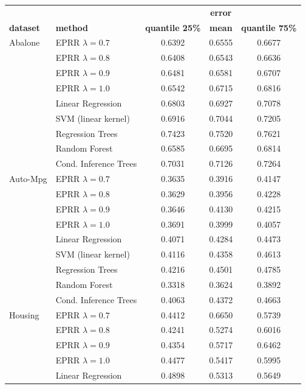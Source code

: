 \documentclass[review,preprint]{elsarticle}
\begin{document}
\begin{table}[t]
	\footnotesize
	\renewcommand{\arraystretch}{0.55}
	\begin{tabular}{ll|ccc}
		&&& \textbf{error} \\
		\textbf{dataset} & \textbf{method} & \textbf{quantile 25\%} & \textbf{mean} & \textbf{quantile 75\%} \\
		\hline
		Abalone	 & EPRR $\lambda = 0.7$ 	& 0.6392 & 0.6555 & 0.6677 \\
					 & EPRR $\lambda = 0.8$ 	& 0.6408 & 0.6543 & 0.6636 \\
					 & EPRR $\lambda = 0.9$ 	& 0.6481 & 0.6581 & 0.6707 \\
					 & EPRR $\lambda = 1.0$ 	& 0.6542 & 0.6715 & 0.6816 \\
					 & Linear Regression 	& 0.6803 & 0.6927 & 0.7078 \\
					 & SVM (linear kernel) 	& 0.6916 & 0.7044 & 0.7205 \\
					 & Regression Trees 	& 0.7423 & 0.7520 & 0.7621 \\
					 & Random Forest 	& 0.6585 & 0.6695 & 0.6814 \\
					 & Cond. Inference Trees 	& 0.7031 & 0.7126 & 0.7264 \\
		\hline
		Auto-Mpg	 & EPRR $\lambda = 0.7$ 	& 0.3635 & 0.3916 & 0.4147 \\
					 & EPRR $\lambda = 0.8$ 	& 0.3629 & 0.3956 & 0.4228 \\
					 & EPRR $\lambda = 0.9$ 	& 0.3646 & 0.4130 & 0.4215 \\
					 & EPRR $\lambda = 1.0$ 	& 0.3691 & 0.3999 & 0.4057 \\
					 & Linear Regression 	& 0.4071 & 0.4284 & 0.4473 \\
					 & SVM (linear kernel) 	& 0.4116 & 0.4358 & 0.4613 \\
					 & Regression Trees 	& 0.4216 & 0.4501 & 0.4785 \\
					 & Random Forest 	& 0.3318 & 0.3624 & 0.3892 \\
					 & Cond. Inference Trees 	& 0.4063 & 0.4372 & 0.4663 \\
		\hline
		Housing	 & EPRR $\lambda = 0.7$ 	& 0.4412 & 0.6650 & 0.5739 \\
					 & EPRR $\lambda = 0.8$ 	& 0.4241 & 0.5274 & 0.6016 \\
					 & EPRR $\lambda = 0.9$ 	& 0.4354 & 0.5717 & 0.6462 \\
					 & EPRR $\lambda = 1.0$ 	& 0.4477 & 0.5417 & 0.5995 \\
					 & Linear Regression 	& 0.4898 & 0.5313 & 0.5649 \\

\end{tabular}
\end{table}
\end{document}
